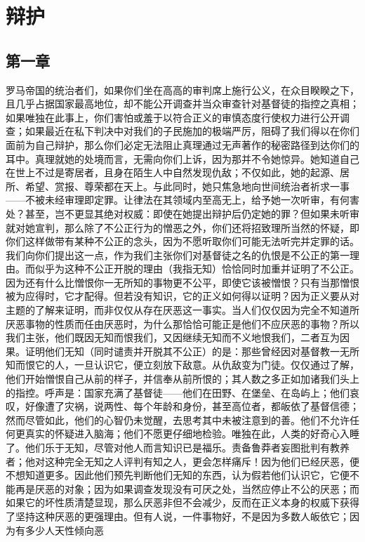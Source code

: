 
\chapter{辩护}



\section{第一章}

罗马帝国的统治者们，如果你们坐在高高的审判席上施行公义，在众目睽睽之下，且几乎占据国家最高地位，却不能公开调查并当众审查针对基督徒的指控之真相；如果唯独在此事上，你们害怕或羞于以符合正义的审慎态度行使权力进行公开调查；如果最近在私下判决中对我们的子民施加的极端严厉，阻碍了我们得以在你们面前为自己辩护，那么你们必定无法阻止真理通过无声著作的秘密路径到达你们的耳中。真理就她的处境而言，无需向你们上诉，因为那并不令她惊异。她知道自己在世上不过是寄居者，且身在陌生人中自然发现仇敌；不仅如此，她的起源、居所、希望、赏报、尊荣都在天上。与此同时，她只焦急地向世间统治者祈求一事——不被未经审理即定罪。让律法在其领域内至高无上，给予她一次听审，有何害处？甚至，岂不更显其绝对权威：即使在她提出辩护后仍定她的罪？但如果未听审就对她宣判，那么除了不公正行为的憎恶之外，你们还将招致理所当然的怀疑，即你们这样做带有某种不公正的念头，因为不愿听取你们可能无法听完并定罪的话。我们向你们提出这一点，作为我们主张你们对基督徒之名的仇恨是不公正的第一理由。而似乎为这种不公正开脱的理由（我指无知）恰恰同时加重并证明了不公正。因为还有什么比憎恨你一无所知的事物更不公平，即使它该被憎恨？只有当那憎恨被为应得时，它才配得。但若没有知识，它的正义如何得以证明？因为正义要从对主题的了解来证明，而非仅仅从存在厌恶这一事实。当人们仅仅因为完全不知道所厌恶事物的性质而任由厌恶时，为什么那恰恰可能正是他们不应厌恶的事物？所以我们主张，他们既因无知而恨我们，又因继续无知而不义地恨我们，二者互为因果。证明他们无知（同时谴责并开脱其不公正）的是：那些曾经因对基督教一无所知而恨它的人，一旦认识它，便立刻放下敌意。从仇敌变为门徒。仅仅通过了解，他们开始憎恨自己从前的样子，并信奉从前所恨的；其人数之多正如加诸我们头上的指控。呼声是：国家充满了基督徒——他们在田野、在堡垒、在岛屿上；他们哀叹，好像遭了灾祸，说两性、每个年龄和身份，甚至高位者，都皈依了基督信德；然而尽管如此，他们的心智仍未觉醒，去思考其中未被注意到的善。他们不允许任何更真实的怀疑进入脑海；他们不愿更仔细地检验。唯独在此，人类的好奇心入睡了。他们乐于无知，尽管对他人而言知识已是福乐。责备鲁莽者妄图批判有教养者；他对这种完全无知之人评判有知之人，更会怎样痛斥！因为他们已经厌恶，便不想知道更多。因此他们预先判断他们无知的东西，认为假若他们认识它，它便不能再是厌恶的对象；因为如果调查发现没有可厌之处，当然应停止不公的厌恶；而如果它的坏性质清楚显现，那么厌恶非但不会减少，反而在正义本身的权威下获得了坚持这种厌恶的更强理由。但有人说，一件事物好，不是因为多数人皈依它；因为有多少人天性倾向恶